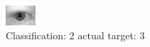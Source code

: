 \begin{figure}[h!]
\begin{center}
\includegraphics[width=0.60\columnwidth]{figures/ID667_class_2_target_3.png}
\end{center}
\caption{ Classification: 2 actual target: 3}
\label{fig:ID667_class_2_target_3}
\end{figure}
